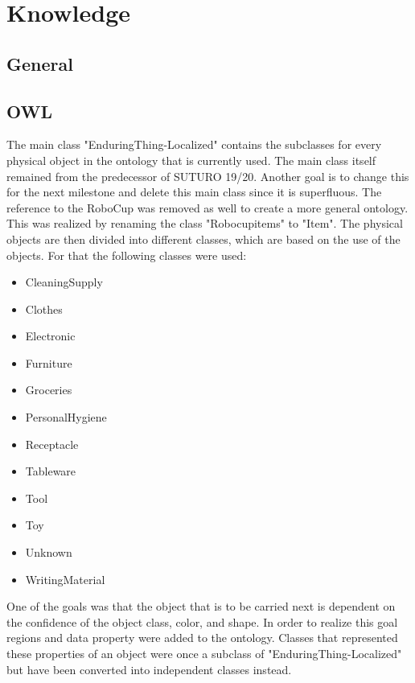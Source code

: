 \documentclass[main.tex]{subfiles}
\begin{document}
	
	\chapter{Knowledge}
		\section{General}
				


		\section{OWL}
		The main class "EnduringThing-Localized" contains the subclasses for every physical object in the ontology that is currently used. The main class itself remained from the predecessor of SUTURO 19/20. Another goal is to change this for the next milestone and delete this main class since it is superfluous.
The reference to the RoboCup was removed as well to create a more general ontology. This was realized by renaming the class "Robocupitems" to "Item". The physical objects are then divided into different classes, which are based on the use of the objects. For that the following classes were used:
		
		\begin{itemize}
		\item CleaningSupply
		\item Clothes
		\item Electronic
		\item Furniture
		\item Groceries
		\item PersonalHygiene
		\item Receptacle
		\item Tableware
		\item Tool
		\item Toy
		\item Unknown
		\item WritingMaterial
		\end{itemize}
		
		One of the goals was that the object that is to be carried next is dependent on the confidence of the object class, color, and shape. In order to realize this goal regions and data property were added to the ontology. Classes that represented these properties of an object were once a subclass of "EnduringThing-Localized" but have been converted into independent classes instead.  
\end{document}

